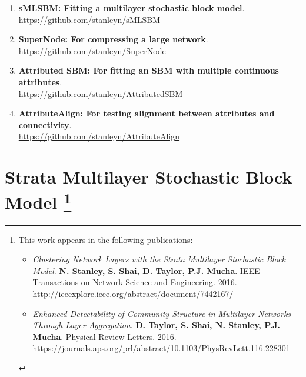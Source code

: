  \begin{enumerate}
 \item {\bf sMLSBM: Fitting a multilayer stochastic block model}. \\ \url{https://github.com/stanleyn/sMLSBM}
 \item {\bf SuperNode: For compressing a large network}. \\ \url{https://github.com/stanleyn/SuperNode}
 \item {\bf Attributed SBM: For fitting an SBM with multiple continuous attributes}. \\ \url{https://github.com/stanleyn/AttributedSBM}
 \item{\bf AttributeAlign: For testing alignment between attributes and connectivity}. \\ \url{https://github.com/stanleyn/AttributeAlign}
 \end{enumerate}
 




\chapter[Strata Multilayer Stochastic Block Model]{Strata Multilayer Stochastic Block Model
\footnote{This work appears in the following publications:
  \begin{itemize}
 \item \emph{Clustering Network Layers with the Strata Multilayer Stochastic Block Model}. {\bf N. Stanley, S. Shai, D. Taylor, P.J. Mucha}. IEEE Transactions on Network Science and Engineering. 2016. \url{http://ieeexplore.ieee.org/abstract/document/7442167/}
\item \emph{Enhanced Detectability of Community Structure in Multilayer Networks Through Layer Aggregation}. {\bf D. Taylor, S. Shai, N. Stanley, P.J. Mucha}. Physical Review Letters. 2016. \url{https://journals.aps.org/prl/abstract/10.1103/PhysRevLett.116.228301}
        \end{itemize}
        }
}



